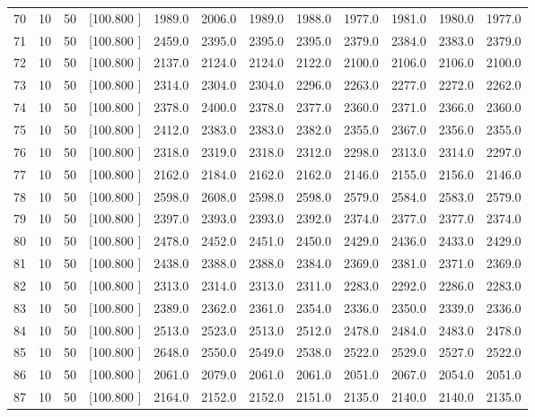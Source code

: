 \documentclass[12pt,a4paper]{article}
\begin{document}
\begin{center}
{\begin{tabular}{r r r r r r r r r r r r}
  70& 10& 50&[100.800   ]&  1989.0&  2006.0&  1989.0&  1988.0&  1977.0&  1981.0&  1980.0&  1977.0\\[-0.02in]
  71& 10& 50&[100.800   ]&  2459.0&  2395.0&  2395.0&  2395.0&  2379.0&  2384.0&  2383.0&  2379.0\\[-0.02in]
  72& 10& 50&[100.800   ]&  2137.0&  2124.0&  2124.0&  2122.0&  2100.0&  2106.0&  2106.0&  2100.0\\[-0.02in]
  73& 10& 50&[100.800   ]&  2314.0&  2304.0&  2304.0&  2296.0&  2263.0&  2277.0&  2272.0&  2262.0\\[-0.02in]
  74& 10& 50&[100.800   ]&  2378.0&  2400.0&  2378.0&  2377.0&  2360.0&  2371.0&  2366.0&  2360.0\\[-0.02in]
  75& 10& 50&[100.800   ]&  2412.0&  2383.0&  2383.0&  2382.0&  2355.0&  2367.0&  2356.0&  2355.0\\[-0.02in]
  76& 10& 50&[100.800   ]&  2318.0&  2319.0&  2318.0&  2312.0&  2298.0&  2313.0&  2314.0&  2297.0\\[-0.02in]
  77& 10& 50&[100.800   ]&  2162.0&  2184.0&  2162.0&  2162.0&  2146.0&  2155.0&  2156.0&  2146.0\\[-0.02in]
  78& 10& 50&[100.800   ]&  2598.0&  2608.0&  2598.0&  2598.0&  2579.0&  2584.0&  2583.0&  2579.0\\[-0.02in]
  79& 10& 50&[100.800   ]&  2397.0&  2393.0&  2393.0&  2392.0&  2374.0&  2377.0&  2377.0&  2374.0\\[-0.02in]
  80& 10& 50&[100.800   ]&  2478.0&  2452.0&  2451.0&  2450.0&  2429.0&  2436.0&  2433.0&  2429.0\\[-0.02in]
  81& 10& 50&[100.800   ]&  2438.0&  2388.0&  2388.0&  2384.0&  2369.0&  2381.0&  2371.0&  2369.0\\[-0.02in]
  82& 10& 50&[100.800   ]&  2313.0&  2314.0&  2313.0&  2311.0&  2283.0&  2292.0&  2286.0&  2283.0\\[-0.02in]
  83& 10& 50&[100.800   ]&  2389.0&  2362.0&  2361.0&  2354.0&  2336.0&  2350.0&  2339.0&  2336.0\\[-0.02in]
  84& 10& 50&[100.800   ]&  2513.0&  2523.0&  2513.0&  2512.0&  2478.0&  2484.0&  2483.0&  2478.0\\[-0.02in]
  85& 10& 50&[100.800   ]&  2648.0&  2550.0&  2549.0&  2538.0&  2522.0&  2529.0&  2527.0&  2522.0\\[-0.02in]
  86& 10& 50&[100.800   ]&  2061.0&  2079.0&  2061.0&  2061.0&  2051.0&  2067.0&  2054.0&  2051.0\\[-0.02in]
  87& 10& 50&[100.800   ]&  2164.0&  2152.0&  2152.0&  2151.0&  2135.0&  2140.0&  2140.0&  2135.0\\[-0.02in]

\end{tabular}}
\end{center}
\end{document}
